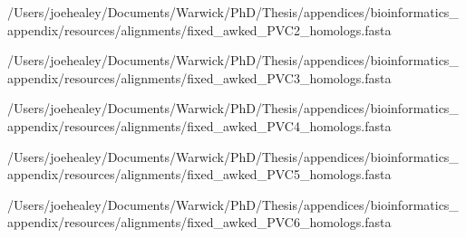 \begin{texshade}{/Users/joehealey/Documents/Warwick/PhD/Thesis/appendices/bioinformatics_appendix/resources/alignments/fixed_awked_PVC2_homologs.fasta}
\noblockskip
\hideconsensus
\end{texshade}

\begin{texshade}{/Users/joehealey/Documents/Warwick/PhD/Thesis/appendices/bioinformatics_appendix/resources/alignments/fixed_awked_PVC3_homologs.fasta}
\noblockskip
\hideconsensus
\end{texshade}

\begin{texshade}{/Users/joehealey/Documents/Warwick/PhD/Thesis/appendices/bioinformatics_appendix/resources/alignments/fixed_awked_PVC4_homologs.fasta}
\noblockskip
\hideconsensus
\end{texshade}

\begin{texshade}{/Users/joehealey/Documents/Warwick/PhD/Thesis/appendices/bioinformatics_appendix/resources/alignments/fixed_awked_PVC5_homologs.fasta}
\noblockskip
\hideconsensus
\end{texshade}

\begin{texshade}{/Users/joehealey/Documents/Warwick/PhD/Thesis/appendices/bioinformatics_appendix/resources/alignments/fixed_awked_PVC6_homologs.fasta}
\noblockskip
\hideconsensus
\end{texshade}

